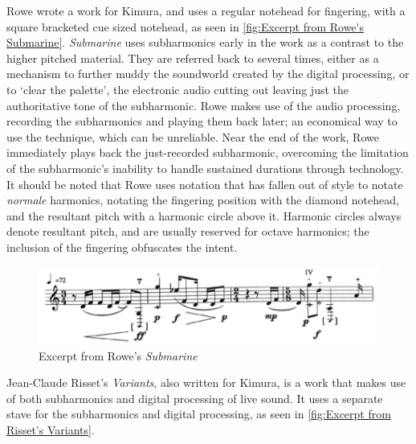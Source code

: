 Rowe wrote a work for Kimura, and uses a regular notehead for fingering, with a square bracketed cue sized notehead, as seen in \autoref{fig:Excerpt from Rowe's Submarine}.\autocite[]{roweSubmarine1996}
\emph{Submarine} uses subharmonics early in the work as a contrast to the higher pitched material.
They are referred back to several times, either as a mechanism to further muddy the soundworld created by the digital processing, or to `clear the palette', the electronic audio cutting out leaving just the authoritative tone of the subharmonic.
Rowe makes use of the audio processing, recording the subharmonics and playing them back later; an economical way to use the technique, which can be unreliable.
Near the end of the work, Rowe immediately plays back the just-recorded subharmonic, overcoming the limitation of the subharmonic's inability to handle sustained durations through technology. 
It should be noted that Rowe uses notation that has fallen out of style to notate \emph{normale} harmonics, notating the fingering position with the diamond notehead, and the resultant pitch with a harmonic circle above it. 
Harmonic circles always denote resultant pitch, and are usually reserved for octave harmonics; the inclusion of the fingering obfuscates the intent.\autocite[420]{gouldBars2011}


\begin{figure}
  \includegraphics[width=\linewidth]{./resources/roweALFExcerpt.pdf}
  \caption{Excerpt from Rowe's \emph{Submarine}}\label{fig:Excerpt from Rowe's Submarine}\end{figure}

Jean-Claude Risset's \emph{Variants}, also written for Kimura, is a work that makes use of both subharmonics and digital processing of live sound.\autocite[]{rissetVariants1995}
It uses a separate stave for the subharmonics and digital processing, as seen in \autoref{fig:Excerpt from Risset's Variants}. 

